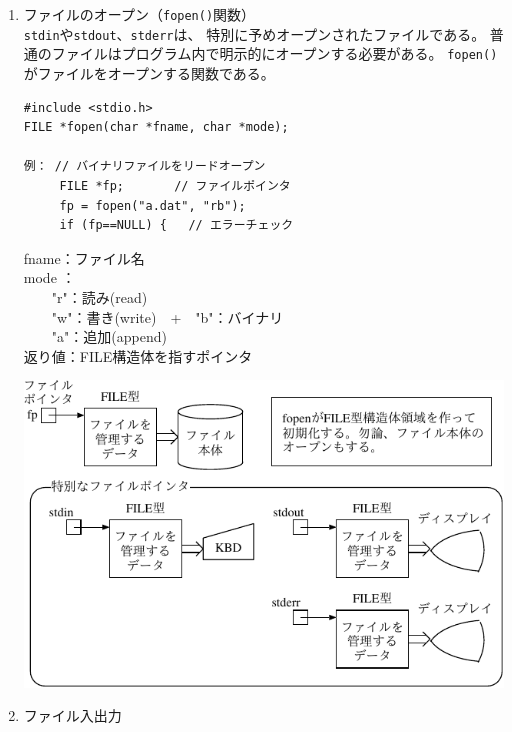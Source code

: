 \documentclass[a4j,dvipdfmx]{jarticle}
\begin{document}
\begin{enumerate}
\item ファイルのオープン（{\tt fopen()}関数）\\
{\tt stdin}や{\tt stdout}、{\tt stderr}は、
特別に予めオープンされたファイルである。
普通のファイルはプログラム内で明示的にオープンする必要がある。
{\tt fopen()}がファイルをオープンする関数である。

\begin{multicols}{2}
\begin{lstlisting}[numbers=none]
#include <stdio.h>
FILE *fopen(char *fname, char *mode);

例： // バイナリファイルをリードオープン
     FILE *fp;       // ファイルポインタ
     fp = fopen("a.dat", "rb");
     if (fp==NULL) {   // エラーチェック
\end{lstlisting}

fname：ファイル名\\
mode ：\\
　　"r"：読み(read)\\
　　"w"：書き(write)　+　"b"：バイナリ\\
　　"a"：追加(append)\\
返り値：FILE構造体を指すポインタ
\end{multicols}

\begin{center}
\includegraphics[scale=1.3]{FILE.pdf}
\end{center}

\item ファイル入出力


\end{enumerate}
\end{document}
